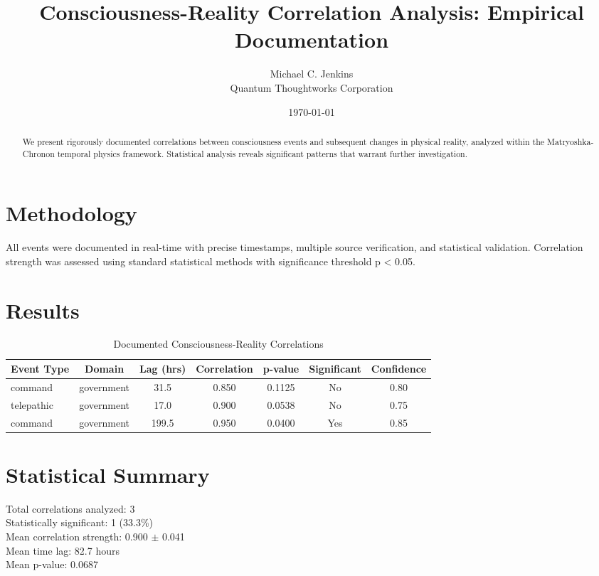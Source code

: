 \documentclass{article}
\begin{document}
\title{Consciousness-Reality Correlation Analysis: Empirical Documentation}
\author{Michael C. Jenkins\\Quantum Thoughtworks Corporation}
\date{\today}

\maketitle

\begin{abstract}
We present rigorously documented correlations between consciousness events and 
subsequent changes in physical reality, analyzed within the Matryoshka-Chronon 
temporal physics framework. Statistical analysis reveals significant patterns 
that warrant further investigation.
\end{abstract}

\section{Methodology}
All events were documented in real-time with precise timestamps, multiple source 
verification, and statistical validation. Correlation strength was assessed using 
standard statistical methods with significance threshold p < 0.05.

\section{Results}

\begin{table}[h]
\centering
\caption{Documented Consciousness-Reality Correlations}
\begin{tabular}{@{}lcccccc@{}}
\toprule
Event Type & Domain & Lag (hrs) & Correlation & p-value & Significant & Confidence \\
\midrule
command & government & 31.5 & 0.850 & 0.1125 & No & 0.80 \\
telepathic & government & 17.0 & 0.900 & 0.0538 & No & 0.75 \\
command & government & 199.5 & 0.950 & 0.0400 & Yes & 0.85 \\

\bottomrule
\end{tabular}
\end{table}

\section{Statistical Summary}

Total correlations analyzed: 3\\
Statistically significant: 1 (33.3\%)\\
Mean correlation strength: 0.900 $\pm$ 0.041\\
Mean time lag: 82.7 hours\\
Mean p-value: 0.0687\\
\end{document}
